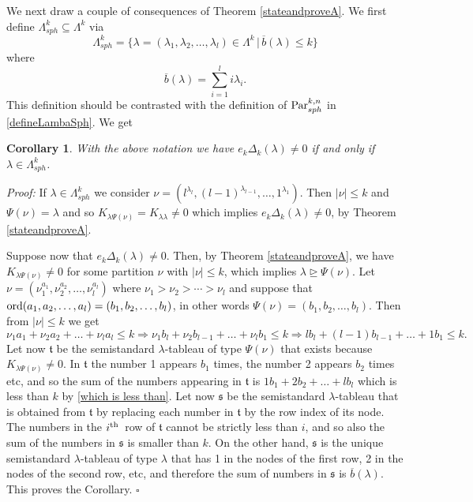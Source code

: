 \documentclass[10pt,hidelinks]{article}
\newcommand{\ord}{{\rm{ord}}}
\newcommand{\Par}{{\rm Par}   }
\newcommand{\ParSph}{  \Par_{sph}^{k, n}}
\newcommand{\s}{\mathfrak{s}}
\newcommand{\T}{  \mathfrak{t}}
\newtheorem{corollary}[theorem]{Corollary}
\newenvironment{dem}{\noindent \textit{Proof:} }{\quad \hfill $\square$}
\numberwithin{equation}{section}
\begin{document}
\medskip

We next draw a couple of consequences of Theorem \ref{stateandproveA}. We first
define $ \Lambda_{sph}^{k} \subseteq \Lambda^k $ via
\begin{equation}\label{concretelydefined2}
  \Lambda_{sph}^{k} = \{ \lambda = (\lambda_1, \lambda_2, \ldots, \lambda_l )  \in \Lambda^k \, | \,  \overline{b}(\lambda) 
\le k   \}
\end{equation}
where
\begin{equation} \overline{b}(\lambda) =  \sum_{i=1}^l i \lambda_i.
\end{equation}
This definition 
should be contrasted with the definition of $\ParSph $ in
\eqref{defineLambaSph}. We get
\begin{corollary}\label{sphpar}
With the above notation we have $ e_k \Delta_k(\lambda) \neq 0 $ if and only if $ \lambda \in \Lambda_{sph}^{k}$. 
\end{corollary}
\begin{dem}
  If $ \lambda \in \Lambda_{sph}^{k} $ we consider $ \nu = (l^{\lambda_l}, (l-1)^{\lambda_{l-1}}, \ldots, 1^{\lambda_1} ) $. Then
  $ | \nu |  \le k $ and $ \Psi(\nu )= \lambda $ and so $ K_{\lambda  \Psi(\nu ) } =  K_{\lambda  \lambda } \neq  0 $
  which implies $ e_k \Delta_k(\lambda) \neq 0$, by Theorem \ref{stateandproveA}.
\medskip
  
Suppose now that $ e_k \Delta_k(\lambda) \neq 0$. Then, by Theorem \ref{stateandproveA}, we have $ K_{\lambda \Psi(\nu)} \neq 0 $ for some
partition 
$ \nu  $ with $ | \nu |  \le k $, which implies $ \lambda \unrhd \Psi(\nu) $. Let $ \nu = ( \nu_1^{ a_1}, \nu_2^{ a_2}, \ldots, \nu_l^{ a_l} ) $
where $ \nu_1 > \nu_2 > \cdots > \nu_l $ and suppose that $ \ord(a_1, a_2, \ldots, a_l ) = (b_1, b_2, \ldots, b_l ) $, in other words
$ \Psi(\nu) = (b_1, b_2, \ldots, b_l ) $. Then from $ | \nu |  \le k $ we get 
\begin{equation}\label{which is less than}
\nu_1 a_1 + \nu_2 a_2 + \ldots + \nu_l a_l \le k \Longrightarrow  \nu_1 b_l + \nu_2 b_{l-1} + \ldots + \nu_l b_1 \le k
\Longrightarrow l  b_l  + (l-1) b_{l-1}  + \ldots + 1 b_1 \le k.
\end{equation}
Let now $ \T $ be the semistandard $ \lambda$-tableau of type $ \Psi(\nu) $ that exists
because $ K_{\lambda \Psi(\nu)} \neq 0 $. In $ \T $ the number 1 appears $ b_1 $ times, the number 2 appears $ b_2 $ times etc, 
and so the sum of the numbers appearing in $ \T $ is
$ 1 b_1 + 2 b_2 + \ldots + l b_l  $ which is less than $ k $ by
\eqref{which is less than}.
Let now $ \s $ be the semistandard $ \lambda $-tableau that
is obtained from $ \T $ by replacing each number in $\T $ by the row index of its node. 
The numbers in the $i^{\color{black} \rm th} \,$ row of $ \T $ cannot be strictly less than $ i$, and so also the sum of the numbers in $ \s $ is
smaller than $ k $. On the other hand, $ \s $ is the unique semistandard $\lambda$-tableau of type $ \lambda$ that
has 1 in the nodes of the first row, 2 in the nodes of the second row, etc, and therefore the sum of
numbers in $ \s $ is $ \overline{b}(\lambda) $. This proves the Corollary. 
\end{dem}
\end{document}
